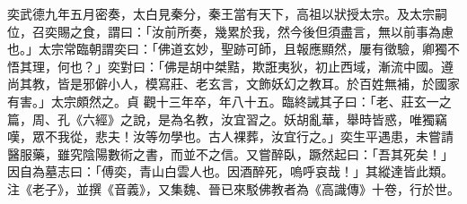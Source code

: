 \begin{pinyinscope}
 奕武德九年五月密奏，太白見秦分，秦王當有天下，高祖以狀授太宗。及太宗嗣位，召奕賜之食，謂曰：「汝前所奏，幾累於我，然今後但須盡言，無以前事為慮也。」太宗常臨朝謂奕曰：「佛道玄妙，聖跡可師，且報應顯然，屢有徵驗，卿獨不悟其理，何也？」奕對曰：「佛是胡中桀黠，欺誑夷狄，初止西域，漸流中國。遵尚其教，皆是邪僻小人，模寫莊、老玄言，文飾妖幻之教耳。於百姓無補，於國家有害。」太宗頗然之。貞
 觀十三年卒，年八十五。臨終誡其子曰：「老、莊玄一之篇，周、孔《六經》之說，是為名教，汝宜習之。妖胡亂華，舉時皆惑，唯獨竊嘆，眾不我從，悲夫！汝等勿學也。古人裸葬，汝宜行之。」奕生平遇患，未嘗請醫服藥，雖究陰陽數術之書，而並不之信。又嘗醉臥，蹶然起曰：「吾其死矣！」因自為墓志曰：「傅奕，青山白雲人也。因酒醉死，嗚呼哀哉！」其縱達皆此類。注《老子》，並撰《音義》，又集魏、晉已來駁佛教者為《高識傳》十卷，行於世。




\end{pinyinscope}
